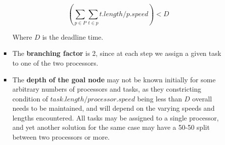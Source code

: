 \documentclass{article}
\begin{document}
\begin{enumerate}
\begin{enumerate}
\begin{itemize}
					$$(\sum_{p \in P}\sum_{t \in p}t.length/p.speed) < D$$
					
					Where $D$ is the deadline time.
					
					\item The \textbf{branching factor} is 2, since at each step we assign a given task to one of the two processors.
					
					\item The \textbf{depth of the goal node} may not be known initially for some arbitrary numbers of processors and tasks, as they constricting condition of $task.length/processor.speed$ being less than $D$ overall needs to be maintained, and will depend on the varying speeds and lengths encountered.  All tasks may be assigned to a single processor, and yet another solution for the same case may have a 50-50 split between two processors or more.
				\end{itemize}
			\end{enumerate}
		
	\end{enumerate}
\end{document}

